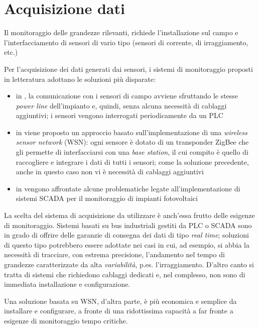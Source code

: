 \section{Acquisizione dati}
Il monitoraggio delle grandezze rilevanti, richiede l'installazione sul campo e 
l'interfacciamento di sensori di vario tipo (sensori di corrente, di irraggiamento, etc.)
%

%
Per l'acquisizione dei dati generati dai sensori, i sistemi di monitoraggio proposti in 
letteratura adottano le soluzioni pi\`u disparate:
%
\begin{itemize}
\item in \cite{roman06}, la comunicazione con i sensori di campo avviene sfruttando  
      le stesse \emph{power line} dell'impianto e, quindi, senza alcuna necessit\`a di 
      cablaggi aggiuntivi; i sensori vengono interrogati periodicamente da un PLC
\item in \cite{xiaoli11} viene proposto un approccio basato sull'implementazione di una 
      \emph{wireless sensor network} (WSN): ogni sensore \`e dotato di un transponder 
      ZigBee\cite{zigbee} che gli permette di interfacciarsi con una \emph{base station},
      il cui compito \`e quello di raccogliere e integrare i dati di tutti i sensori;
      come la soluzione precedente, anche in questo caso non vi \`e necessit\`a di 
      cablaggi aggiuntivi
\item in \cite{guozhen09} vengono affrontate alcune problematiche legate 
      all'implementazione di sistemi SCADA per il monitoraggio di impianti fotovoltaici
\end{itemize}
%
La scelta del sistema di acquisizione da utilizzare \`e anch'essa frutto delle esigenze 
di monitoraggio. 
%
Sistemi basati su bus industriali gestiti da PLC o SCADA sono in grado di 
offrire delle garanzie di consegna dei dati di tipo \emph{real time}; 
%
soluzioni di questo tipo potrebbero essere adottate nei casi in cui, ad esempio, 
si abbia la necessit\`a di tracciare, con estrema precisione, l'andamento nel tempo 
di grandezze caratterizzate da alta \emph{variabilit\`a}, p.es. l'irraggiamento.
D'altro canto si tratta di sistemi che richiedono cablaggi dedicati e, nel complesso, 
non sono di immediata installazione e configurazione.
%

%
Una soluzione basata su WSN, d'altra parte, \`e pi\`u economica e semplice da 
installare e configurare, a fronte di una ridottissima capacit\`a a far fronte a 
esigenze di monitoraggio tempo critiche.
%
